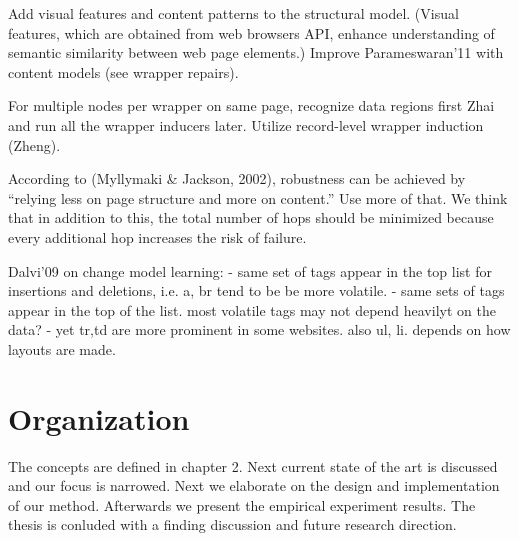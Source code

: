 Add visual features and content patterns to the structural model. (Visual features, which are obtained from web browsers API, enhance understanding of semantic similarity between web page elements.) Improve Parameswaran'11 with content models (see wrapper repairs).

For multiple nodes per wrapper on same page, recognize data regions first Zhai and run all the wrapper inducers later. Utilize record-level wrapper induction (Zheng).

According to (Myllymaki \& Jackson, 2002), robustness can be achieved by “relying less on page structure and more on content.” Use more of that. We think that in addition to this, the total number of hops should be minimized because every additional hop increases the risk of failure.

Dalvi'09 on change model learning:
- same set of tags appear in the top list for insertions and deletions, i.e. a, br tend to be be more volatile.
- same sets of tags appear in the top of the list. most volatile tags may not depend heavilyt on the data?
- yet tr,td are more prominent in some websites. also ul, li. depends on how layouts are made.


\section{Organization}

The concepts are defined in chapter 2. Next current state of the art is discussed and our focus is narrowed. Next we elaborate on the design and implementation of our method. Afterwards we present the empirical experiment results. The thesis is conluded with a finding discussion and future research direction.


